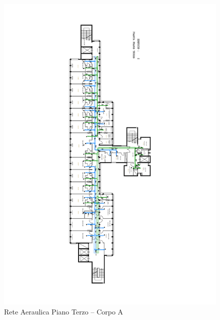 \begin{figure}
	\centering
	\includegraphics[width=\hsize]{6_4_cap/img/aeraulica}
	\caption{Rete Aeraulica Piano Terzo -- Corpo A}
	\label{img:aer}
\end{figure}
